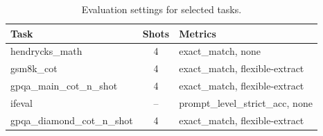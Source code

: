\begin{table}[h!]
\centering
\begin{tabular}{|l|c|l|}
\hline
\textbf{Task} & \textbf{Shots} & \textbf{Metrics} \\
\hline
hendrycks\_math & 4 & exact\_match, none \\
gsm8k\_cot & 4 & exact\_match, flexible-extract \\
gpqa\_main\_cot\_n\_shot & 4 & exact\_match, flexible-extract \\
ifeval & -- & prompt\_level\_strict\_acc, none \\
gpqa\_diamond\_cot\_n\_shot & 4 & exact\_match, flexible-extract \\
\hline
\end{tabular}
\caption{Evaluation settings for selected tasks.}
\label{tab:eval-settings}
\end{table}
